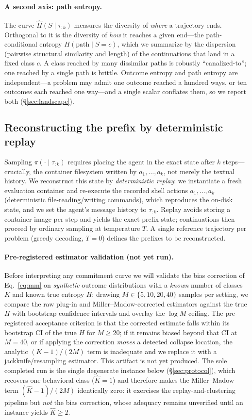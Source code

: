 \documentclass[11pt]{article}
\newcommand{\Hk}{\widehat{H}\!\left(S \mid \tau_{:k}\right)}
\newcommand{\strat}{S}
\newcommand{\prefix}{\tau_{:k}}
\begin{document}
\paragraph{A second axis: path entropy.}
The curve $\Hk$ measures the diversity of \emph{where} a trajectory ends.
Orthogonal to it is the diversity of \emph{how} it reaches a given end---the
path-conditional entropy $H(\text{path}\mid \strat{=}c)$, which we summarize by the
dispersion (pairwise structural similarity and length) of the continuations that
land in a fixed class $c$. A class reached by many dissimilar paths is robustly
``canalized-to''; one reached by a single path is brittle. Outcome entropy and
path entropy are independent---a problem may admit one outcome reached a hundred
ways, or ten outcomes each reached one way---and a single scalar conflates them, so
we report both (\S\ref{sec:landscape}).

\subsection{Reconstructing the prefix by deterministic replay}
\label{sec:replay}
Sampling $\pi(\cdot\mid\prefix)$ requires placing the agent in the exact state
after $k$ steps---crucially, the container filesystem written by $a_1,\dots,a_k$,
not merely the textual history. We reconstruct this state by \emph{deterministic
replay}: we instantiate a fresh evaluation container and re-execute the recorded
shell actions $a_1,\dots,a_k$ (deterministic file-reading/writing commands),
which reproduces the on-disk state, and we set the agent's message history to
$\prefix$. Replay avoids storing a container image per step and yields the exact
prefix state; continuations then proceed by ordinary sampling at temperature $T$.
A single reference trajectory per problem (greedy decoding, $T=0$) defines the
prefixes to be reconstructed.

\paragraph{Pre-registered estimator validation (not yet run).}
Before interpreting any commitment curve we will validate the bias correction of
Eq.~\eqref{eq:mm} on \emph{synthetic} outcome distributions with a \emph{known}
number of classes $K$ and known true entropy $H$: drawing $M\in\{5,10,20,40\}$
samples per setting, we compare the raw plug-in and Miller--Madow-corrected
estimators against the true $H$ with bootstrap confidence intervals and overlay the
$\log M$ ceiling. The pre-registered acceptance criterion is that the corrected
estimate falls within its bootstrap CI of the true $H$ for $M\ge20$; if it remains
biased beyond that CI at $M=40$, or if applying the correction \emph{moves} a
detected collapse location, the analytic $(K-1)/(2M)$ term is inadequate and we
replace it with a jackknife/resampling estimator. This artifact is not yet produced.
The sole completed run is the single degenerate instance below
(\S\ref{sec:protocol}), which recovers one behavioral class ($\hat K=1$) and
therefore makes the Miller--Madow term $(\hat K-1)/(2M)$ identically zero: it
exercises the replay-and-clustering pipeline but \emph{not} the bias correction,
whose adequacy remains unverified until an instance yields $\hat K\ge2$.
\end{document}
